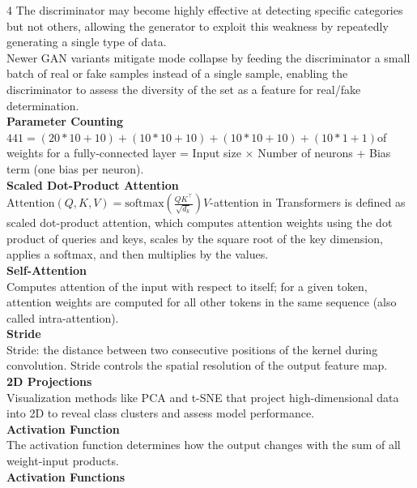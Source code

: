 \documentclass[8pt]{extarticle}
\begin{document}
\begin{multicols}{4}
The discriminator may become highly effective at detecting specific categories but not others, allowing the generator to exploit this weakness by repeatedly generating a single type of data.\\
Newer GAN variants mitigate mode collapse by feeding the discriminator a small batch of real or fake samples instead of a single sample, enabling the discriminator to assess the diversity of the set as a feature for real/fake determination.\\
\vspace{2pt}\textbf{Parameter Counting}\\
$441 = (20*10 + 10) + (10*10 + 10) + (10*10 + 10) + (10*1 + 1)$\Number of weights for a fully-connected layer = Input size $\times$ Number of neurons + Bias term (one bias per neuron).\\
\vspace{2pt}\textbf{Scaled Dot-Product Attention}\\
$\text{Attention}(Q, K, V) = \text{softmax}\!\left(\frac{Q K^{\top}}{\sqrt{d_k}}\right) V$\Self-attention in Transformers is defined as scaled dot-product attention, which computes attention weights using the dot product of queries and keys, scales by the square root of the key dimension, applies a softmax, and then multiplies by the values.\\
\vspace{2pt}\textbf{Self-Attention}\\
Computes attention of the input with respect to itself; for a given token, attention weights are computed for all other tokens in the same sequence (also called intra-attention).\\
\vspace{2pt}\textbf{Stride}\\
Stride: the distance between two consecutive positions of the kernel during convolution. Stride controls the spatial resolution of the output feature map.\\
\vspace{2pt}\textbf{2D Projections}\\
Visualization methods like PCA and t-SNE that project high-dimensional data into 2D to reveal class clusters and assess model performance.\\
\vspace{2pt}\textbf{Activation Function}\\
The activation function determines how the output changes with the sum of all weight-input products.\\
\vspace{2pt}\textbf{Activation Functions}\\

\end{multicols}
\end{document}
